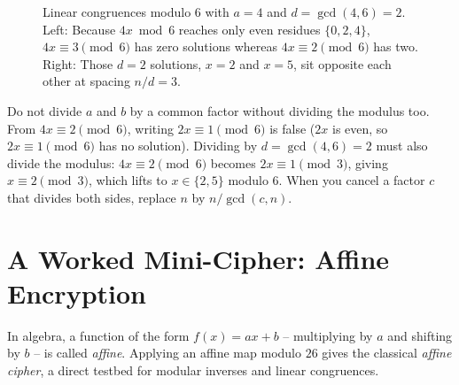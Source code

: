 \begin{figure}[htbp]
\caption{Linear congruences modulo $6$ with $a = 4$ and $d = \gcd(4,6) = 2$. Left: Because $4x \bmod 6$ reaches only even residues $\{0,2,4\}$, $4x \equiv 3 \pmod{6}$ has zero solutions whereas $4x \equiv 2 \pmod{6}$ has two. Right: Those $d = 2$ solutions, $x = 2$ and $x = 5$, sit opposite each other at spacing $n/d = 3$.}
\label{fig:ch03-lincon-solutions}
\end{figure}

\begin{trapbox}
Do not divide $a$ and $b$ by a common factor without dividing the modulus too. From $4x \equiv 2 \pmod{6}$, writing $2x \equiv 1 \pmod{6}$ is false ($2x$ is even, so $2x \equiv 1 \pmod{6}$ has no solution). Dividing by $d = \gcd(4,6) = 2$ must also divide the modulus: $4x\equiv 2\pmod{6}$ becomes $2x \equiv 1 \pmod{3}$, giving $x\equiv 2\pmod{3}$, which lifts to $x \in \{2,5\}$ modulo $6$. When you cancel a factor $c$ that divides both sides, replace $n$ by $n/\gcd(c,n)$.
\end{trapbox}

\section{A Worked Mini-Cipher: Affine Encryption}

In algebra, a function of the form $f(x) = ax + b$ -- multiplying by $a$ and shifting by $b$ -- is called \emph{affine}. Applying an affine map modulo $26$ gives the classical \emph{affine cipher}, a direct testbed for modular inverses and linear congruences.


